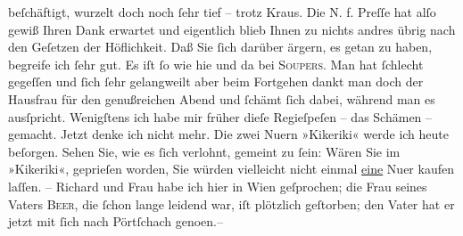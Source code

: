                beſchäftigt, wurzelt doch noch{ }ſehr tief – trotz Kraus. Die N. f. Preſſe hat alſo gewiß
               Ihren Dank erwartet und eigentlich blieb Ihnen zu nichts andres übrig nach den
               Geſetzen der Höflichkeit. Daß Sie{ }ſich darüber ärgern, es getan zu haben, begreife
               ich{ }ſehr gut. Es iſt{ }ſo wie hie und da bei \textsc{Soupers}. Man hat{ }ſchlecht gegeſſen und{ }ſich{ }ſehr gelangweilt aber beim Fortgehen dankt man doch der
               Hausfrau für den genußreichen Abend und{ }ſchämt{ }ſich dabei, während man es ausſpricht.
               Wenigſtens ich habe mir früher dieſe Regieſpeſen – das Schämen – gemacht. Jetzt denke
               ich nicht mehr. {\pb}Die zwei Nu{\geminationm}ern »Kikeriki« werde ich heute
               beſorgen. Sehen Sie, wie es{ }ſich verlohnt, gemeint zu{ }ſein: Wären Sie im »Kikeriki«, geprieſen worden, Sie würden
               vielleicht nicht einmal \uline{eine} Nu{\geminationm}er kaufen laſſen. – Richard und Frau
               habe ich hier in Wien geſprochen; die Frau seines Vaters \textsc{Beer}, die{ }ſchon lange leidend war, iſt plötzlich geſtorben; den Vater hat er jetzt mit{ }ſich nach Pörtſchach geno{\geminationm}en.–\pend
           

